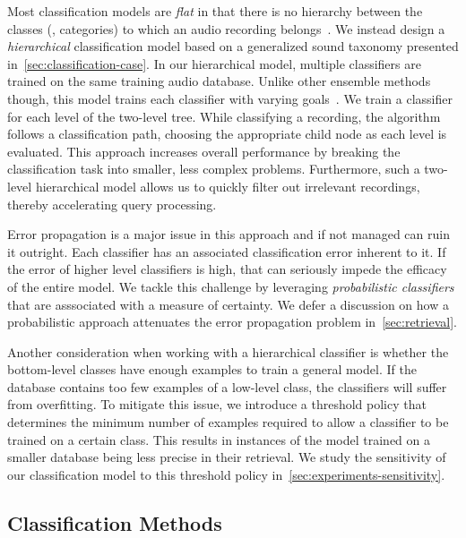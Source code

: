 Most classification models are \textit{flat} in that there is no hierarchy
between the classes (\ie, categories) to which an audio recording
belongs~.
%
We instead design a \textit{hierarchical} classification model based on a
generalized sound taxonomy presented in~\cref{sec:classification-case}.
%
In our hierarchical model, multiple classifiers are trained on the same 
training audio database.
%
Unlike other ensemble methods though, this model trains each classifier with
varying goals~\cite{chou-hierarchical-2003}. 
%
We train a classifier for each level of the two-level tree. 
%
While classifying a recording, the algorithm follows a classification path,
choosing the appropriate child node as each level is evaluated.
%
This approach increases overall performance by breaking the classification 
task into smaller, less complex problems. 
%
Furthermore, such a two-level hierarchical model allows us to quickly filter out
irrelevant recordings, thereby accelerating query processing.

%
Error propagation is a major issue in this approach and if not managed can ruin
it outright. 
%
Each classifier has an associated classification error inherent to it.
%
If the error of higher level classifiers is high, that can seriously impede the
efficacy of the entire model. 
%
We tackle this challenge by leveraging \textit{probabilistic classifiers} that
are asssociated with a measure of certainty.
%
We defer a discussion on how a probabilistic approach attenuates the error
propagation problem in~\cref{sec:retrieval}.

%
Another consideration when working with a hierarchical classifier is whether 
the bottom-level classes have enough examples to train a general model.
%
If the database contains too few examples of a low-level class, the classifiers 
will suffer from overfitting. 
%
To mitigate this issue, we introduce a threshold policy that determines the
minimum number of examples required to allow a classifier to be trained on a
certain class.
%
This results in instances of the model trained on a smaller database being less
precise in their retrieval.
%
We study the sensitivity of our classification model to this threshold policy
in~\cref{sec:experiments-sensitivity}.

\subsection{Classification Methods}
\label{sec:classification-methods}

